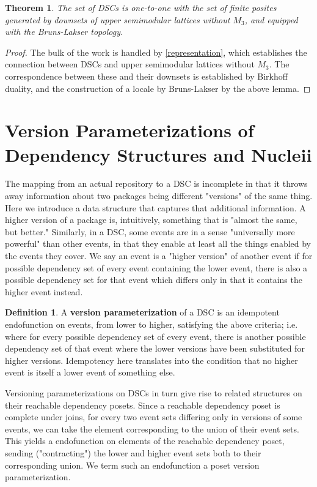 \documentclass[hoptionsi,review,format=acmsmall]{acmart}
\newtheorem{theorem}{Theorem}[section]
\theoremstyle{definition}
\newtheorem{definition}{Definition}[section]
\begin{document}
\begin{theorem}
The set of DSCs is one-to-one with the set of finite posites generated by downsets of upper semimodular lattices without \(M_3\), and equipped with the Bruns-Lakser topology.
\end{theorem}
\begin{proof}
The bulk of the work is handled by \ref{representation}, which establishes the connection between DSCs and upper semimodular lattices without \(M_3\). The correspondence between these and their downsets is established by Birkhoff duality, and the construction of a locale by Bruns-Lakser by the above lemma.
\end{proof}

\section{Version Parameterizations of Dependency Structures and Nucleii}

The mapping from an actual repository to a DSC is incomplete in that it throws away information about two packages being different "versions" of the same thing. Here we introduce a data structure that captures that additional information. A higher version of a package is, intuitively, something that is "almost the same, but better." Similarly, in a DSC, some events are in a sense "universally more powerful" than other events, in that they enable at least all the things enabled by the events they cover. We say an event is a "higher version" of another event if for possible dependency set of every event containing the lower event, there is also a possible dependency set for that event which differs only in that it contains the higher event instead.

\begin{definition}
A \textbf{version parameterization} of a DSC is an idempotent endofunction on events, from lower to higher, satisfying the above criteria; i.e. where for every possible dependency set of every event, there is another possible dependency set of that event where the lower versions have been substituted for higher versions. Idempotency here translates into the condition that no higher event is itself a lower event of something else.
\end{definition}

Versioning parameterizations on DSCs in turn give rise to related structures on their reachable dependency posets. Since a reachable dependency poset is complete under joins, for every two event sets differing only in versions of some events, we can take the element corresponding to the union of their event sets. This yields a  endofunction on elements of the reachable dependency poset, sending ("contracting") the lower and higher event sets both to their corresponding union. We term such an endofunction a poset version parameterization.
\end{document}
